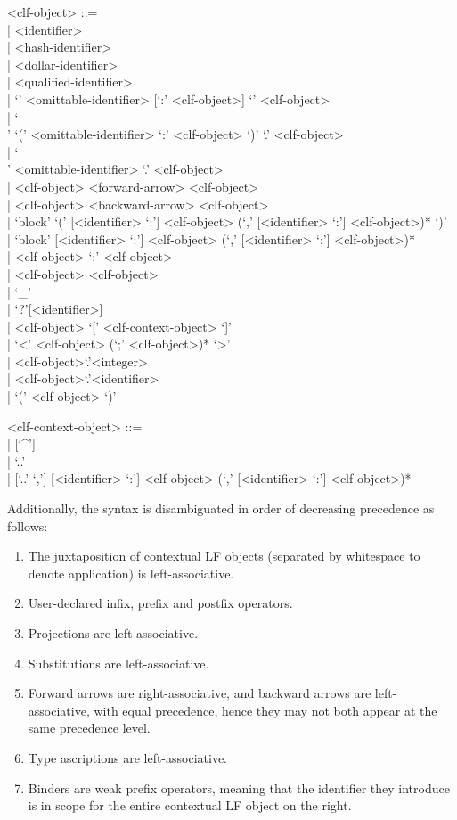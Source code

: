 \documentclass[11pt]{article}
\newcommand{\LF}{\textsc{LF}\xspace}
\begin{document}
\begin{grammar}
<clf-object> ::= \hfill\\
| <identifier>\\
| <hash-identifier>\\
| <dollar-identifier>\\
| <qualified-identifier>\\
| `{' <omittable-identifier> [`:' <clf-object>] `}' <clf-object>\\
| `\\' `(' <omittable-identifier> `:' <clf-object> `)' `.' <clf-object>\\
| `\\' <omittable-identifier> `.' <clf-object>\\
| <clf-object> <forward-arrow> <clf-object>\\
| <clf-object> <backward-arrow> <clf-object>\\
| `block' `(' [<identifier> `:'] <clf-object> (`,' [<identifier> `:'] <clf-object>)* `)'\\
| `block' [<identifier> `:'] <clf-object> (`,' [<identifier> `:'] <clf-object>)*\\
| <clf-object> `:' <clf-object>\\
| <clf-object> <clf-object>\\
| `_'\\
| `?'[<identifier>]\\
| <clf-object> `[' <clf-context-object> `]'\\
| `<' <clf-object> (`;' <clf-object>)* `>'\\
| <clf-object>`.'<integer>\\
| <clf-object>`.'<identifier>\\
| `(' <clf-object> `)'

<clf-context-object> ::= \hfill\\
| [`^']\\
| `..'\\
| [`..' `,'] [<identifier> `:'] <clf-object> (`,' [<identifier> `:'] <clf-object>)*
\end{grammar}

Additionally, the syntax is disambiguated in order of decreasing precedence as follows:

\begin{enumerate}
\item The juxtaposition of contextual \LF objects (separated by whitespace to denote application) is left-associative.
\item User-declared infix, prefix and postfix operators.
\item Projections are left-associative.
\item Substitutions are left-associative.
\item Forward arrows are right-associative, and backward arrows are left-associative, with equal precedence, hence they may not both appear at the same precedence level.
\item Type ascriptions are left-associative.
\item Binders are weak prefix operators, meaning that the identifier they introduce is in scope for the entire contextual \LF object on the right.
\end{enumerate}
\end{document}
